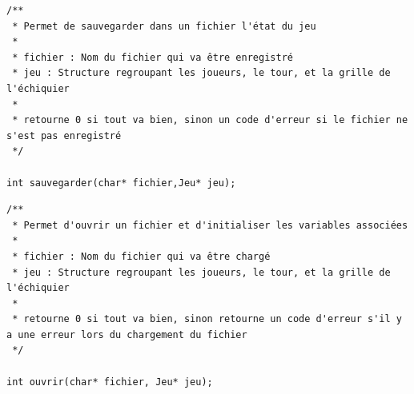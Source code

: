 \documentclass[12pt]{article}
\begin{document}
\begin{lstlisting}
/**
 * Permet de sauvegarder dans un fichier l'état du jeu
 * 
 * fichier : Nom du fichier qui va être enregistré
 * jeu : Structure regroupant les joueurs, le tour, et la grille de l'échiquier
 * 
 * retourne 0 si tout va bien, sinon un code d'erreur si le fichier ne s'est pas enregistré
 */

int sauvegarder(char* fichier,Jeu* jeu);
\end{lstlisting}

\begin{lstlisting}
/**
 * Permet d'ouvrir un fichier et d'initialiser les variables associées
 * 
 * fichier : Nom du fichier qui va être chargé
 * jeu : Structure regroupant les joueurs, le tour, et la grille de l'échiquier
 * 
 * retourne 0 si tout va bien, sinon retourne un code d'erreur s'il y a une erreur lors du chargement du fichier
 */

int ouvrir(char* fichier, Jeu* jeu);
\end{lstlisting}
\end{document}
